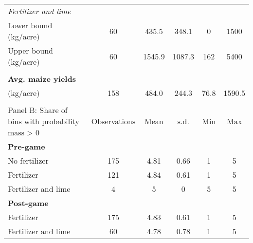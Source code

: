 \begin{table}[htbp]
\begin{threeparttable}
\begin{tabular}{l ccccc}
\textit{Fertilizer and lime}&            &            &            &            &            \\
\hspace{0.1cm} Lower bound (kg/acre)&          60&       435.5&       348.1&           0&        1500\\
\hspace{0.1cm} Upper bound (kg/acre)&          60&      1545.9&      1087.3&         162&        5400\\
 & & & & & \\
%
\textbf{Avg. maize yields}&            &            &            &            &            \\
(kg/acre)           &         158&       484.0&       244.3&        76.8&      1590.5\\
\hline
\hline
\\
%
Panel B: Share of bins with probability mass > 0                    &Observations&        Mean&        s.d.&         Min&         Max\\
\textbf{Pre-game}   &            &            &            &            &            \\
No fertilizer       &         175&        4.81&        0.66&           1&           5\\
Fertilizer          &         121&        4.84&        0.61&           1&           5\\
Fertilizer and lime &           4&           5&           0&           5&           5\\
\textbf{Post-game}  &            &            &            &            &            \\
Fertilizer          &         175&        4.83&        0.61&           1&           5\\
Fertilizer and lime &          60&        4.78&        0.78&           1&           5\\
\hline
\hline
\end{tabular}
\end{threeparttable}
\end{table}

